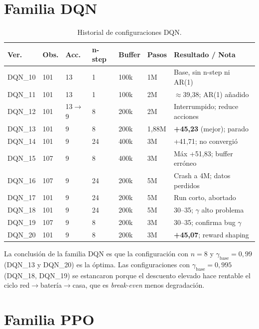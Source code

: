 \documentclass[12pt, a4paper, twoside]{report}
\begin{document}
\section{Familia DQN}

\begin{table}[H]
\centering
\caption{Historial de configuraciones DQN.}
\label{tab:hist_dqn}
\small
\begin{tabularx}{\textwidth}{lL{1.4cm}L{1cm}L{1.3cm}L{1.2cm}L{1.3cm}X}
\toprule
\textbf{Ver.} & \textbf{Obs.} & \textbf{Acc.} & \textbf{n-step} &
\textbf{Buffer} & \textbf{Pasos} & \textbf{Resultado / Nota} \\
\midrule
DQN\_10 & 101 & 13 & 1 & 100k & 1M & Base, sin n-step ni AR(1) \\
DQN\_11 & 101 & 13 & 1 & 100k & 2M & $\approx$39{,}38; AR(1) añadido \\
DQN\_12 & 101 & 13$\to$9 & 8 & 200k & 2M & Interrumpido; reduce acciones \\
DQN\_13 & 101 & 9 & 8 & 200k & 1{,}88M & \textbf{+45{,}23} (mejor); parado \\
DQN\_14 & 101 & 9 & 24 & 400k & 3M & +41{,}71; no convergió \\
DQN\_15 & 107 & 9 & 8 & 400k & 3M & Máx +51{,}83; buffer erróneo \\
DQN\_16 & 107 & 9 & 24 & 200k & 5M & Crash a 4M; datos perdidos \\
DQN\_17 & 101 & 9 & 24 & 200k & 5M & Run corto, abortado \\
DQN\_18 & 101 & 9 & 24 & 200k & 5M & 30--35; $\gamma$ alto problema \\
DQN\_19 & 107 & 9 & 8 & 200k & 3M & 30--35; confirma bug $\gamma$ \\
DQN\_20 & 101 & 9 & 8 & 200k & 3M & \textbf{+45{,}07}; reward shaping \\
\bottomrule
\end{tabularx}
\end{table}

La conclusión de la familia DQN es que la configuración con $n=8$ y
$\gamma_{\text{base}} = 0{,}99$ (DQN\_13 y DQN\_20) es la óptima. Las
configuraciones con $\gamma_{\text{base}} = 0{,}995$ (DQN\_18, DQN\_19) se
estancaron porque el descuento elevado hace rentable el ciclo
red$\to$batería$\to$casa, que es \textit{break-even} menos degradación.

\section{Familia PPO}
\end{document}
